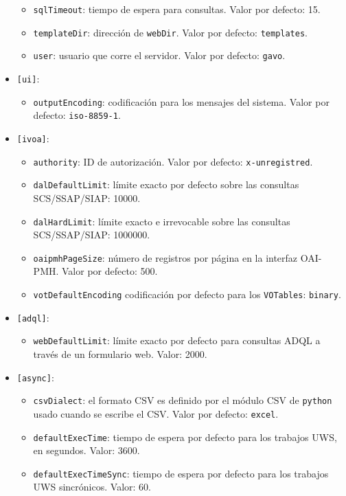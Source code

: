 \begin{itemize}
\begin{itemize}
			\item \verb;sqlTimeout;: tiempo de espera para consultas. Valor por defecto: 15.
			\item \verb;templateDir;: dirección de \verb;webDir;. Valor por defecto: \verb;templates;.
			\item \verb;user;: usuario que corre el servidor. Valor por defecto: \verb;gavo;.
		\end{itemize}
	\item \verb;[ui];:
		\begin{itemize}
			\item \verb;outputEncoding;: codificación para los mensajes del sistema. Valor por defecto: \verb;iso-8859-1;.
		\end{itemize}
	\item \verb;[ivoa];:
		\begin{itemize}
			\item \verb;authority;: ID de autorización. Valor por defecto: \verb;x-unregistred;.
			\item \verb;dalDefaultLimit;: límite exacto por defecto sobre las consultas SCS/SSAP/SIAP: 10000.
			\item \verb;dalHardLimit;: límite exacto e irrevocable sobre las consultas SCS/SSAP/SIAP: 1000000.
			\item \verb;oaipmhPageSize;: número de registros por página en la interfaz OAI-PMH. Valor por defecto: 500.
			\item \verb;votDefaultEncoding; codificación por defecto para los \verb;VOTables;: \verb;binary;.
		\end{itemize}
	\item \verb;[adql];:
		\begin{itemize}
			\item \verb;webDefaultLimit;: límite exacto por defecto para consultas ADQL a trav\'es de un formulario web. Valor: 2000.
		\end{itemize}
	\item \verb;[async];:
		\begin{itemize}
			\item \verb;csvDialect;: el formato CSV es definido por el módulo CSV de \verb;python; usado cuando se escribe el CSV. Valor por defecto: \verb;excel;.
			\item \verb;defaultExecTime;: tiempo de espera por defecto para los trabajos UWS, en segundos. Valor: 3600.
			\item \verb;defaultExecTimeSync;: tiempo de espera por defecto para los trabajos UWS sincrónicos. Valor: 60.

\end{itemize}
\end{itemize}
